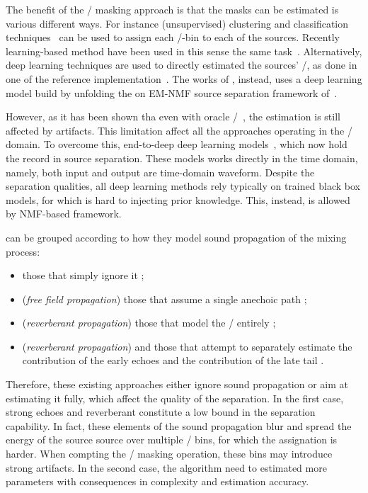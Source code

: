 \mynewline
The benefit of the \TF/ masking approach is that the masks can be estimated is various different ways.
For instance (unsupervised) clustering and classification techniques~ can be used to assign each \TF/-bin to each of the sources.
Recently learning-based method have been used in this sense the same task~.
Alternatively, deep learning techniques are used to directly estimated the sources' \TF/, as done in one of the reference implementation~.
The works of , instead, uses a deep learning model build by unfolding the on EM-NMF source separation framework of~.

\mynewline
However, as it has been shown tha even with oracle \TF/~, the estimation is still affected by artifacts.
This limitation affect all the approaches operating in the \TF/ domain.
To overcome this, end-to-deep deep learning models~, which now hold the record in source separation.
These models works directly in the time domain, namely, both input and output are time-domain waveform.
Despite the separation qualities, all deep learning methods rely typically on trained black box models, for which is hard to injecting prior knowledge.
This, instead, is allowed by NMF-based framework.

 can be grouped according to how they model sound propagation of the mixing process:
\begin{itemize}
    \item those that simply ignore it ;
    \item (\textit{free field propagation}) those that assume a single anechoic path  ;
    \item (\textit{reverberant propagation}) those that model the \RTFs/ entirely ;
    \item (\textit{reverberant propagation}) and those that attempt to separately estimate the contribution of the early echoes and the contribution of the late tail .
\end{itemize}
Therefore, these existing approaches either ignore sound propagation or aim at estimating it fully, which affect the quality of the separation.
In the first case, strong echoes and reverberant constitute a low bound in the separation capability.
In fact, these elements of the sound propagation blur and spread the energy of the source source over multiple \TF/ bins, for which the assignation is harder.
When compting the \TF/ masking operation, these bins may introduce strong artifacts.
In the second case, the algorithm need to estimated more parameters with consequences in complexity and estimation accuracy.

